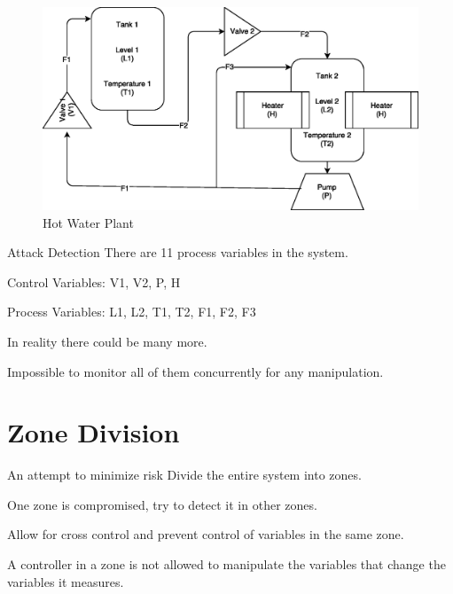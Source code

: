 \documentclass[10pt]{beamer}
\begin{document}
\begin{frame}
	\begin{figure}
		\centering
		\includegraphics[width=\textwidth]{plant.eps}
		\caption{\label{fig:CN}Hot Water Plant}
	\end{figure}
\end{frame}

\begin{frame}{Attack Detection}
	There are 11 process variables in the system.
    
    Control Variables: V1, V2, P, H
    
    Process Variables: L1, L2, T1, T2, F1, F2, F3
	
    \begin{center}
    	
    \end{center}
	
	In reality there could be many more.
    
    Impossible to monitor all of them concurrently for any manipulation.
\end{frame}

\section{Zone Division\cite{hashimoto2013safety}}

\begin{frame}{An attempt to minimize risk}
	Divide the entire system into zones.
    
    One zone is compromised, try to detect it in other zones.
    
    Allow for cross control and prevent control of variables in the same zone.
    
    A controller in a zone is not allowed to manipulate the variables that change the variables it measures.
\end{frame}
\end{document}
